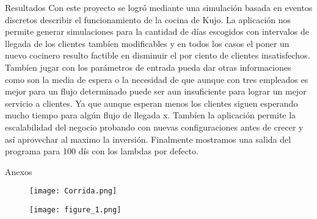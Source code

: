 \documentclass[]{article}
\begin{document}
\begin{section} {Resultados}
	Con este proyecto se logr\'{o} mediante una simulaci\'{o}n basada en eventos discretos describir el funcionamiento de la cocina de Kujo. La aplicaci\'{o}n nos permite generar simulaciones para la cantidad de d\'{i}as escogidos con intervalos de llegada de los clientes tamb\'{i}en modificables y en todos los casos el poner un nuevo cocinero resulto factible en disminuir el por ciento de clientes insatisfechos. Tamb\'{i}en jugar con los par\'{a}metros de entrada pueda dar otras informaciones como son la media de espera o la necesidad de que aunque con tres empleados es mejor para un flujo determinado puede ser aun insuficiente para lograr un mejor servicio a clientes. Ya que aunque esperan menos los clientes siguen esperando mucho tiempo para alg\'{u}n flujo de llegada x. Tamb\'{i}en la aplicaci\'{o}n permite la escalabilidad del negocio probando con nuevas configuraciones antes de crecer y as\'{i} aprovechar al maximo la inversi\'{o}n. Finalmente mostramos una salida del programa para 100 d\'{i}s con los lambdas por defecto.
	    
\end{section}
\begin{section} {Anexos}
	\begin{figure}
		\texttt{[image: Corrida.png]}
		
		
		\caption{}
	\end{figure}
\begin{figure}
		\texttt{[image: figure\_1.png]}
	
	
	
	\caption{}
\end{figure}


	
\end{section}
	
\end{document}
